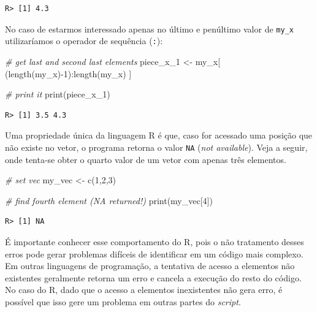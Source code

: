 \documentclass[
  11pt,
]{book}
\newenvironment{Shaded}{\begin{snugshade}}{\end{snugshade}}
\newcommand{\CommentTok}[1]{\textcolor[rgb]{0.37,0.37,0.37}{\textit{#1}}}
\newcommand{\DecValTok}[1]{\textcolor[rgb]{0.06,0.06,0.06}{#1}}
\newcommand{\FunctionTok}[1]{\textcolor[rgb]{0,0,0}{#1}}
\newcommand{\NormalTok}[1]{#1}
\newcommand{\OtherTok}[1]{\textcolor[rgb]{0.37,0.37,0.37}{#1}}
\newcommand{\SpecialCharTok}[1]{\textcolor[rgb]{0,0,0}{#1}}
\begin{document}
\begin{verbatim}
R> [1] 4.3
\end{verbatim}

No caso de estarmos interessado apenas no último e penúltimo valor de \texttt{my\_x} utilizaríamos o operador de sequência (\texttt{:}):

\begin{Shaded}
\begin{Highlighting}[]
\CommentTok{\# get last and second last elements}
\NormalTok{piece\_x\_1 }\OtherTok{\textless{}{-}}\NormalTok{ my\_x[ (}\FunctionTok{length}\NormalTok{(my\_x)}\SpecialCharTok{{-}}\DecValTok{1}\NormalTok{)}\SpecialCharTok{:}\FunctionTok{length}\NormalTok{(my\_x) ]}

\CommentTok{\# print it}
\FunctionTok{print}\NormalTok{(piece\_x\_1)}
\end{Highlighting}
\end{Shaded}

\begin{verbatim}
R> [1] 3.5 4.3
\end{verbatim}

Uma propriedade única da linguagem R é que, caso for acessado uma posição que não existe no vetor, o programa retorna o valor \texttt{NA} (\emph{not available}). Veja a seguir, onde tenta-se obter o quarto valor de um vetor com apenas três elementos.

\begin{Shaded}
\begin{Highlighting}[]
\CommentTok{\# set vec}
\NormalTok{my\_vec }\OtherTok{\textless{}{-}} \FunctionTok{c}\NormalTok{(}\DecValTok{1}\NormalTok{,}\DecValTok{2}\NormalTok{,}\DecValTok{3}\NormalTok{)}

\CommentTok{\# find fourth element (NA returned!)}
\FunctionTok{print}\NormalTok{(my\_vec[}\DecValTok{4}\NormalTok{])}
\end{Highlighting}
\end{Shaded}

\begin{verbatim}
R> [1] NA
\end{verbatim}

É importante conhecer esse comportamento do R, pois o não tratamento desses erros pode gerar problemas difíceis de identificar em um código mais complexo. Em outras linguagens de programação, a tentativa de acesso a elementos não existentes geralmente retorna um erro e cancela a execução do resto do código. No caso do R, dado que o acesso a elementos inexistentes não gera erro, é possível que isso gere um problema em outras partes do \emph{script}.
\end{document}
